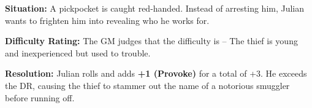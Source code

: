 \begin{WyrdExample}
	\textbf{Situation:} A pickpocket is caught red-handed. Instead of arresting him, Julian wants to frighten him into revealing who he works for.

	\noindent\textbf{Difficulty Rating:} The GM judges that the difficulty is \Basic – The thief is young and inexperienced but used to trouble.

	\noindent\textbf{Resolution:} Julian rolls  and adds \textbf{+1 (Provoke)} for a total of +3. He exceeds the DR, causing the thief to stammer out the name of a notorious smuggler before running off.
\end{WyrdExample}


